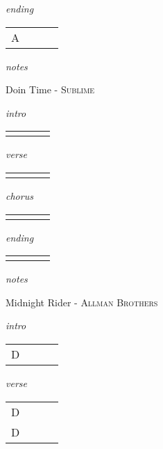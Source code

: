 \documentclass[12pt]{article}
\begin{document}
\textit{ending}

\begin{tabular}{|P{1.25in}|P{1.25in}|P{1.25in}|P{1.25in}|}
  A &   &   &   \\
\end{tabular}

\textit{notes}

\newpage

{\Huge Doin Time} {\huge - \textsc{Sublime}}

\huge
\textit{intro}

\begin{tabular}{|P{1.25in}|P{1.25in}|P{1.25in}|P{1.25in}|}
    &   &   &   \\
\end{tabular}

\textit{verse}

\begin{tabular}{|P{1.25in}|P{1.25in}|P{1.25in}|P{1.25in}|}
    &   &   &   \\
\end{tabular}

\textit{chorus}

\begin{tabular}{|P{1.25in}|P{1.25in}|P{1.25in}|P{1.25in}|}
    &   &   &   \\
\end{tabular}

\textit{ending}

\begin{tabular}{|P{1.25in}|P{1.25in}|P{1.25in}|P{1.25in}|}
    &   &   &   \\
\end{tabular}

\textit{notes}

\newpage

{\Huge Midnight Rider} {\huge - \textsc{Allman Brothers}}

\huge
\textit{intro}

\begin{tabular}{|P{1.25in}|P{1.25in}|P{1.25in}|P{1.25in}|}
  D &   &   &   \\
\end{tabular}

\textit{verse}

\begin{tabular}{|P{1.25in}|P{1.25in}|P{1.25in}|P{1.25in}|}
  D   &   &   &   \\
  D   &   &   &   \\
\end{tabular}
\end{document}
